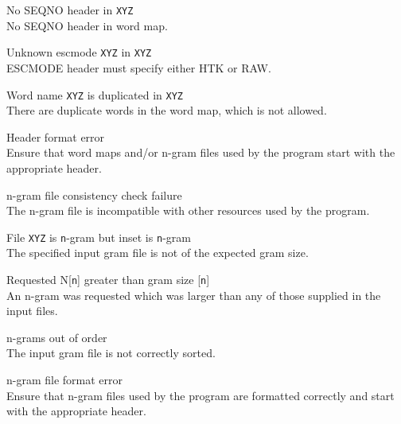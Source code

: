 \begin{itemize}
\begin{itemize}
 No SEQNO header in \texttt{XYZ}\\
        No SEQNO header in word map.

 Unknown escmode \texttt{XYZ} in \texttt{XYZ}\\
        ESCMODE header must specify either HTK or RAW.

 Word name \texttt{XYZ} is duplicated in \texttt{XYZ}\\
        There are duplicate words in the word map, which is not allowed.

\end{itemize}



\begin{itemize}
   Header format error\\
        Ensure that word maps and/or n-gram files used by the program start
        with the appropriate header.
\end{itemize}



\begin{itemize}
   n-gram file consistency check failure\\
        The n-gram file is incompatible with other resources used by the
        program.

   File \texttt{XYZ} is \texttt{n}-gram but inset is \texttt{n}-gram\\
        The specified input gram file is not of the expected gram size.

   Requested N[\texttt{n}] greater than gram size [\texttt{n}]\\
        An n-gram was requested which was larger than any of those
        supplied in the input files.

   n-grams out of order\\
        The input gram file is not correctly sorted.

   n-gram file format error\\
        Ensure that n-gram files used by the program are formatted correctly
        and start with the appropriate header.
\end{itemize}




\end{itemize}
